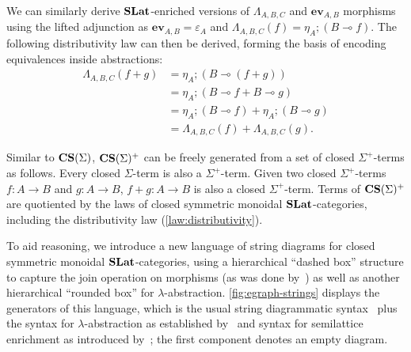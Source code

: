 We can similarly derive $\mathbf{SLat}$-enriched versions of  $\Lambda_{A,B,C}$ and $\textbf{ev}_{A,B}$ morphisms using the lifted adjunction as $\textbf{ev}_{A,B} = \varepsilon_{A}$ and $\Lambda_{A,B,C}(f) = \eta_A; (B \multimap{} f)$.
The following distributivity law can then be derived, forming the basis of encoding equivalences inside abstractions:
\begin{equation}
	\begin{aligned}
		\Lambda_{A,B,C}(f + g) & = \eta_A;(B \multimap (f + g))                    \\
		                       & = \eta_A;(B \multimap f + B \multimap g)          \\
		                       & = \eta_A;(B \multimap f) + \eta_A;(B \multimap g) \\
		                       & = \Lambda_{A,B,C}(f) + \Lambda_{A,B,C}(g).
	\end{aligned}%
	\label{law:distributivity}
\end{equation}

Similar to $\mathbf{CS}(\Sigma)$, $\mathbf{CS}(\Sigma)^{+}$ can be freely generated from a set of closed $\Sigma^{+}$-terms as follows.
Every closed $\Sigma$-term is also a $\Sigma^{+}$-term.
Given two closed $\Sigma^{+}$-terms $f\colon A \to B$ and $g\colon A \to B$, $f + g\colon A \to B$ is also a closed $\Sigma^{+}$-term.
Terms of $\mathbf{CS}(\Sigma)^{+}$ are quotiented by the laws of closed symmetric monoidal $\mathbf{SLat}$-categories, including the distributivity law (\autoref{law:distributivity}).

To aid reasoning, we introduce a new language of string diagrams for closed symmetric monoidal $\mathbf{SLat}$-categories, using a hierarchical \enquote{dashed box} structure to capture the join operation on morphisms (as was done by~\citet{tiurin2025equivalencehypergraphsdporewriting}) as well as another hierarchical \enquote{rounded box} for $\lambda$-abstraction.
\autoref{fig:egraph-strings} displays the generators of this language, which is the usual string diagrammatic syntax~\cite{Selinger_2010} plus the syntax for $\lambda$-abstraction as established by~\citet{ghica2024stringdiagramslambdacalculifunctional} and syntax for semilattice enrichment as introduced by~\citet{tiurin2025equivalencehypergraphsdporewriting}; the first component denotes an empty diagram.


